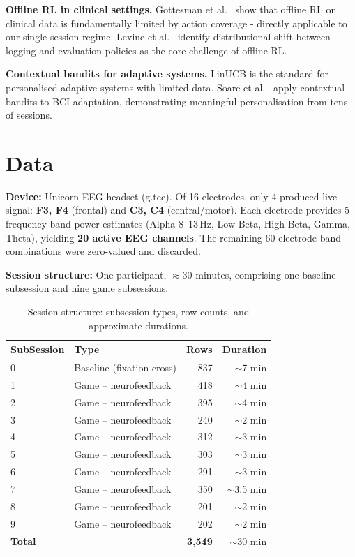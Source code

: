 \documentclass[11pt,a4paper]{article}
\begin{document}
\textbf{Offline RL in clinical settings.}
Gottesman et al.\ \cite{gottesman2019} show that offline RL on clinical data is
fundamentally limited by action coverage - directly applicable to our single-session
regime. Levine et al.\ \cite{levine2020} identify distributional shift between
logging and evaluation policies as the core challenge of offline RL.

\textbf{Contextual bandits for adaptive systems.}
LinUCB \cite{li2010} is the standard for personalised adaptive systems with
limited data. Soare et al.\ \cite{soare2020} apply contextual bandits to BCI
adaptation, demonstrating meaningful personalisation from tens of sessions.

\section{Data}

\textbf{Device:} Unicorn EEG headset (g.tec). Of 16 electrodes, only 4 produced
live signal: \textbf{F3, F4} (frontal) and \textbf{C3, C4} (central/motor).
Each electrode provides 5 frequency-band power estimates (Alpha 8--13\,Hz,
Low Beta, High Beta, Gamma, Theta), yielding \textbf{20 active EEG channels}.
The remaining 60 electrode-band combinations were zero-valued and discarded.

\textbf{Session structure:} One participant, $\approx$30 minutes, comprising one
baseline subsession and nine game subsessions.

\begin{table}[H]
\centering\small
\caption{Session structure: subsession types, row counts, and approximate durations.}
\begin{tabular}{llrr}
\toprule
\textbf{SubSession} & \textbf{Type} & \textbf{Rows} & \textbf{Duration} \\
\midrule
0 & Baseline (fixation cross) & 837 & $\sim$7 min \\
1 & Game -- neurofeedback & 418 & $\sim$4 min \\
2 & Game -- neurofeedback & 395 & $\sim$4 min \\
3 & Game -- neurofeedback & 240 & $\sim$2 min \\
4 & Game -- neurofeedback & 312 & $\sim$3 min \\
5 & Game -- neurofeedback & 303 & $\sim$3 min \\
6 & Game -- neurofeedback & 291 & $\sim$3 min \\
7 & Game -- neurofeedback & 350 & $\sim$3.5 min \\
8 & Game -- neurofeedback & 201 & $\sim$2 min \\
9 & Game -- neurofeedback & 202 & $\sim$2 min \\
\midrule
\textbf{Total} & & \textbf{3,549} & $\sim$30 min \\
\bottomrule
\end{tabular}
\end{table}
\end{document}
